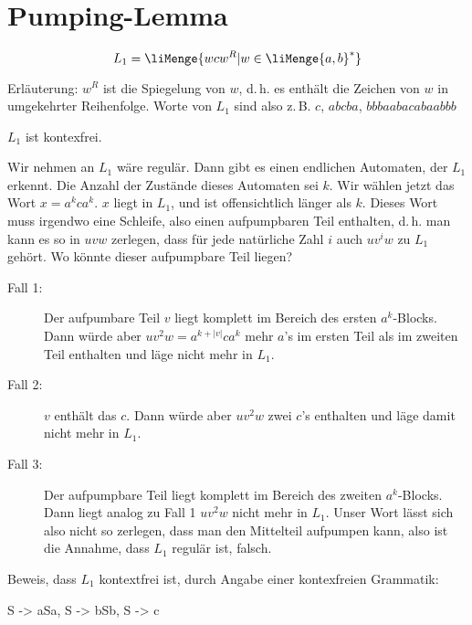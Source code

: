 \documentclass{lehramt-informatik-aufgabe}
\begin{document}
\section{Pumping-Lemma
}


\begin{displaymath}
L_1 = \liMenge{ w c w^R | w \in \liMenge{a, b}^* }
\end{displaymath}

Erläuterung: $w^R$ ist die Spiegelung von $w$, d.\,h. es enthält die
Zeichen von $w$ in umgekehrter Reihenfolge. Worte von $L_1$ sind also
z.\,B. $c$, $abcba$, $bbbaabacabaabbb$

\begin{liAntwort}
$L_1$ ist kontexfrei.


\noindent
Wir nehmen an $L_1$ wäre regulär. Dann gibt es einen endlichen
Automaten, der $L_1$ erkennt. Die Anzahl der Zustände dieses Automaten
sei $k$. Wir wählen jetzt das Wort $x = a^k c a^k$. $x$ liegt in $L_1$,
und ist offensichtlich länger als $k$. Dieses Wort muss irgendwo eine
Schleife, also einen aufpumpbaren Teil enthalten, d.\,h. man kann es so
in $uvw$ zerlegen, dass für jede natürliche Zahl $i$ auch $uv^iw$ zu
$L_1$ gehört. Wo könnte dieser aufpumpbare Teil liegen?

\begin{description}
\item[Fall 1:]

Der aufpumbare Teil $v$ liegt komplett im Bereich des ersten
$a^k$-Blocks. Dann würde aber $uv^2w = a^{k + |v|} c a^k$ mehr $a$’s im
ersten Teil als im zweiten Teil enthalten und läge nicht mehr in $L_1$.

\item[Fall 2:]

$v$ enthält das $c$. Dann würde aber $u v^2 w$ zwei $c$’s enthalten und
läge damit nicht mehr in $L_1$.

\item[Fall 3:]

Der aufpumpbare Teil liegt komplett im Bereich des zweiten $a^k$-Blocks.
Dann liegt analog zu Fall 1 $u v^2 w$ nicht mehr in $L_1$. Unser Wort
lässt sich also nicht so zerlegen, dass man den Mittelteil aufpumpen
kann, also ist die Annahme, dass $L_1$ regulär ist, falsch.
\end{description}
\noindent
Beweis, dass $L_1$ kontextfrei ist, durch Angabe einer kontexfreien
Grammatik:

\noindent
\begin{liProduktionsRegeln}
S -> aSa,
S -> bSb,
S -> c
\end{liProduktionsRegeln}
\end{liAntwort}
\end{document}
